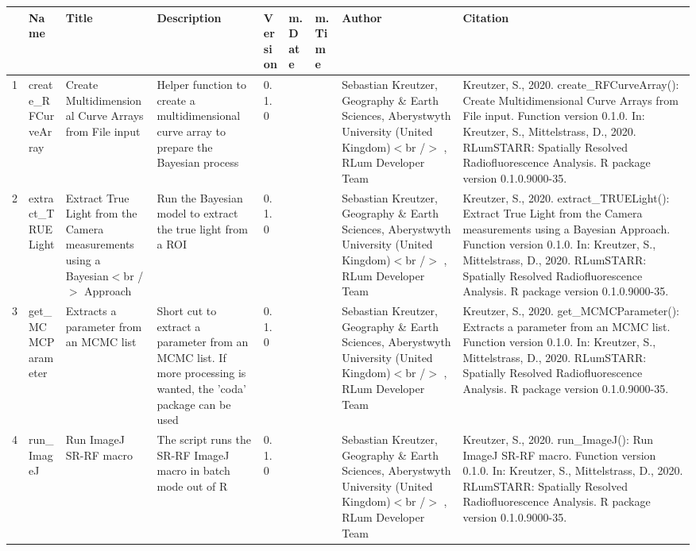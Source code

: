 \begin{table}[ht]
\centering
\begin{tabular}{rllllllll}
  \hline
 & Name & Title & Description & Version & m.Date & m.Time & Author & Citation \\ 
  \hline
1 & create\_RFCurveArray & Create Multidimensional Curve Arrays from File input & Helper function to create a multidimensional curve array to prepare the Bayesian process & 0.1.0
 &  &  & Sebastian Kreutzer, Geography \& Earth Sciences, Aberystwyth University (United Kingdom)$<$br /$>$ , RLum Developer Team & Kreutzer, S., 2020. create\_RFCurveArray(): Create Multidimensional Curve Arrays from File input. Function version 0.1.0. In: Kreutzer, S., Mittelstrass, D., 2020. RLumSTARR: Spatially Resolved Radiofluorescence Analysis. R package version 0.1.0.9000-35. 
 \\ 
  2 & extract\_TRUELight & Extract True Light from the Camera measurements using a Bayesian$<$br /$>$ Approach & Run the Bayesian model to extract the true light from a ROI & 0.1.0
 &  &  & Sebastian Kreutzer, Geography \& Earth Sciences, Aberystwyth University (United Kingdom)$<$br /$>$ , RLum Developer Team & Kreutzer, S., 2020. extract\_TRUELight(): Extract True Light from the Camera measurements using a Bayesian Approach. Function version 0.1.0. In: Kreutzer, S., Mittelstrass, D., 2020. RLumSTARR: Spatially Resolved Radiofluorescence Analysis. R package version 0.1.0.9000-35. 
 \\ 
  3 & get\_MCMCParameter & Extracts a parameter from an MCMC list & Short cut to extract a parameter from an MCMC list. If more processing is wanted, the  'coda'  package can be used & 0.1.0
 &  &  & Sebastian Kreutzer, Geography \& Earth Sciences, Aberystwyth University (United Kingdom)$<$br /$>$ , RLum Developer Team & Kreutzer, S., 2020. get\_MCMCParameter(): Extracts a parameter from an MCMC list. Function version 0.1.0. In: Kreutzer, S., Mittelstrass, D., 2020. RLumSTARR: Spatially Resolved Radiofluorescence Analysis. R package version 0.1.0.9000-35. 
 \\ 
  4 & run\_ImageJ & Run ImageJ SR-RF macro & The script runs the SR-RF ImageJ macro in batch mode out of R & 0.1.0
 &  &  & Sebastian Kreutzer, Geography \& Earth Sciences, Aberystwyth University (United Kingdom)$<$br /$>$ , RLum Developer Team & Kreutzer, S., 2020. run\_ImageJ(): Run ImageJ SR-RF macro. Function version 0.1.0. In: Kreutzer, S., Mittelstrass, D., 2020. RLumSTARR: Spatially Resolved Radiofluorescence Analysis. R package version 0.1.0.9000-35. 
 \\ 
   \hline
\end{tabular}
\end{table}

